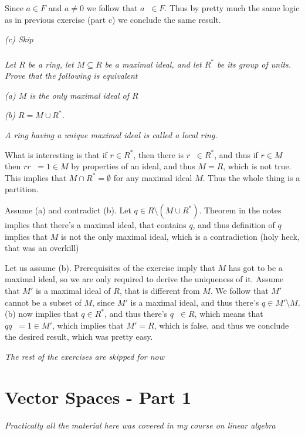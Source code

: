 \documentclass[11pt,oneside,titlepage]{book}
\DeclareMathOperator \inv {^{-1}}
\begin{document}
Since $a \in F$ and $a \neq 0$ we follow that $a \inv \in F$. Thus by
pretty much the same logic as in previous exercise (part c) we
conclude the same result.

\textit{(c) Skip}

\subsection{}

\textit{Let $R$ be a ring, let $M \subseteq R$ be a maximal ideal, and
let $R^*$ be its group of units. Prove that the following is
equivalent}

\textit{(a) $M$ is the only maximal ideal of $R$}

\textit{(b) $R = M \cup R^*$.}

\textit{A ring having a unique maximal ideal is called a local ring.}

What is interesting is that if $r \in R^*$, then there is $r\inv \in
R^*$, and thus if $r \in M$ then $r r\inv = 1 \in M$ by properties of
an ideal, and thus $M = R$, which is not true. This implies that $M
\cap R^* = \emptyset$ for any maximal ideal $M$. Thus the whole thing
is a partition.

Assume (a) and contradict (b). Let $q \in R \setminus (M \cup
R^*)$. Theorem in the notes implies that there's a maximal ideal,
that contains $q$, and thus definition of $q$ implies that $M$ is
not the only maximal ideal, which is a contradiction (holy heck,
that was an overkill)

Let us assume (b). Prerequisites of the exercise imply that $M$ has
got to be a maximal ideal, so we are only required to derive the
uniqueness of it. Assume that $M'$ is a maximal ideal of $R$,
that is different from $M$. We follow that $M'$ cannot
be a subset of $M$, since $M'$ is a maximal ideal, and thus
there's $q \in M' \setminus M$. (b) now implies that $q \in R^*$,
and thus there's $q\inv \in R$, which means that $q q\inv = 1 \in M'$,
which implies that $M' = R$, which is false, and thus we conclude the
desired result, which was pretty easy.

\textit{The rest of the exercises are skipped for now}

\chapter{Vector Spaces - Part 1}

\textit{Practically all the material here was covered in my course on
  linear algebra }
\end{document}
